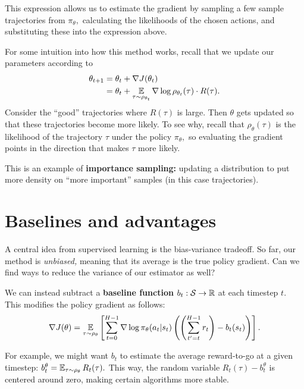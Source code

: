 \documentclass[\main/main]{subfiles}
\begin{document}
This expression allows us to estimate the gradient by sampling a few sample trajectories from $\pi_\theta,$ calculating the likelihoods of the chosen actions, and substituting these into the expression above.

For some intuition into how this method works, recall that we update our parameters according to \[
    \begin{split}
        \theta_{t+1} &= \theta_t + \nabla J(\theta_t) \\
        &= \theta_t + \operatorname*{\mathbb{E}}_{\tau \sim \rho_{\theta_t}} \nabla \log \rho_{\theta_t}(\tau) \cdot R(\tau).
    \end{split}
\]
Consider the ``good'' trajectories where $R(\tau)$ is large. Then $\theta$ gets updated so that these trajectories become more likely. To see why, recall that $\rho_{\theta}(\tau)$ is the likelihood of the trajectory $\tau$ under the policy $\pi_\theta,$ so evaluating the gradient points in the direction that makes $\tau$ more likely.

This is an example of \textbf{importance sampling:} updating a distribution to put more density on ``more important'' samples (in this case trajectories).

\section{Baselines and advantages}


A central idea from supervised learning is the bias-variance tradeoff. So far, our method is \emph{unbiased,} meaning that its average is the true policy gradient. Can we find ways to reduce the variance of our estimator as well?

We can instead subtract a \textbf{baseline function} $b_t : \mathcal{S} \to \mathbb{R}$ at each timestep $t.$ This modifies the policy gradient as follows: \[
    \nabla J(\theta) = \operatorname*{\mathbb{E}}_{\tau \sim \rho_\theta} \left[
        \sum_{t=0}^{H-1} \nabla \log \pi_\theta (a_t | s_t) \left(
            \left(
                \sum_{t' = t}^{H-1} r_t
            \right)
            - b_t(s_t)
        \right)
    \right].
\]

For example, we might want $b_t$ to estimate the average reward-to-go at a given timestep: $b_t^\theta = \operatorname*{\mathbb{E}}_{\tau \sim \rho_\theta} R_t(\tau).$ This way,
the random variable $R_t(\tau) - b_t^\theta$ is centered around zero,
making certain algorithms more stable.
\end{document}

